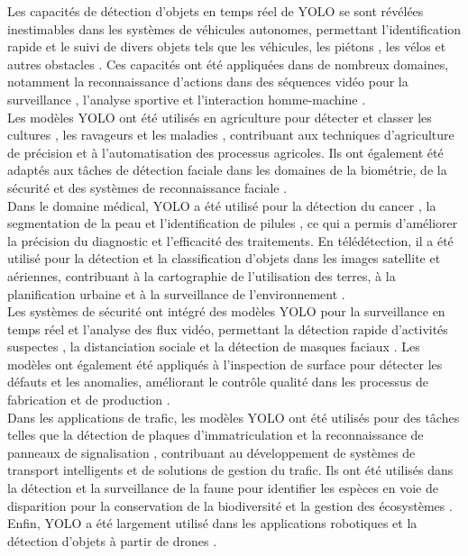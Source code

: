 \documentclass{article}
\begin{document}
Les capacités de détection d'objets en temps réel de YOLO se sont révélées inestimables dans les systèmes de véhicules autonomes, permettant l'identification rapide et le suivi de divers objets tels que les véhicules, les piétons \cite{1,2}, les vélos et autres obstacles \cite{3, 4, 5, 6}. Ces capacités ont été appliquées dans de nombreux domaines, notamment la reconnaissance d'actions \cite{7} dans des séquences vidéo pour la surveillance \cite{8}, l'analyse sportive \cite{9} et l'interaction homme-machine \cite{10}.
\vspace{0.2cm}\\
Les modèles YOLO ont été utilisés en agriculture pour détecter et classer les cultures \cite{11, 12}, les ravageurs et les maladies \cite{13}, contribuant aux techniques d'agriculture de précision et à l'automatisation des processus agricoles. Ils ont également été adaptés aux tâches de détection faciale dans les domaines de la biométrie, de la sécurité et des systèmes de reconnaissance faciale \cite{14, 15}.
\vspace{0.2cm}\\
Dans le domaine médical, YOLO a été utilisé pour la détection du cancer \cite{16, 17}, la segmentation de la peau \cite{18} et l'identification de pilules \cite{19}, ce qui a permis d'améliorer la précision du diagnostic et l'efficacité des traitements. En télédétection, il a été utilisé pour la détection et la classification d'objets dans les images satellite et aériennes, contribuant à la cartographie de l'utilisation des terres, à la planification urbaine et à la surveillance de l'environnement \cite{20, 21, 22, 23}.
\vspace{0.2cm}\\
Les systèmes de sécurité ont intégré des modèles YOLO pour la surveillance en temps réel et l'analyse des flux vidéo, permettant la détection rapide d'activités suspectes \cite{24}, la distanciation sociale et la détection de masques faciaux \cite{25}. Les modèles ont également été appliqués à l'inspection de surface pour détecter les défauts et les anomalies, améliorant le contrôle qualité dans les processus de fabrication et de production \cite{26, 27, 28}.
\vspace{0.2cm}\\
Dans les applications de trafic, les modèles YOLO ont été utilisés pour des tâches telles que la détection de plaques d'immatriculation \cite{29} et la reconnaissance de panneaux de signalisation \cite{30}, contribuant au développement de systèmes de transport intelligents et de solutions de gestion du trafic. Ils ont été utilisés dans la détection et la surveillance de la faune pour identifier les espèces en voie de disparition pour la conservation de la biodiversité et la gestion des écosystèmes \cite{31}. Enfin, YOLO a été largement utilisé dans les applications robotiques \cite{32, 33} et la détection d'objets à partir de drones \cite{34, 35}.
\end{document}
